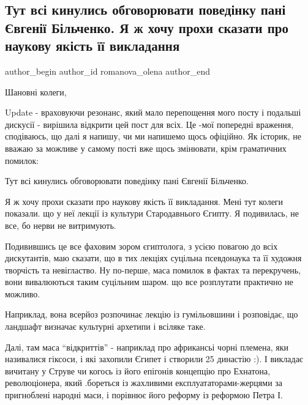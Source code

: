  
 
 
 
 
 
\subsection{Тут всі кинулись обговорювати поведінку пані Євгенії Більченко. Я ж хочу прохи сказати про наукову якість її викладання}
\label{sec:27_01_2021.fb.romanova_olena.1.bilchenko_egiptologia}
\ifcmt
 author_begin
   author_id romanova_olena
 author_end
\fi

Шановні колеги,

Update - враховуючи резонанс, який мало перепощення мого посту і подальші
дискусії - вирішила відкрити цей пост для всіх. Це -мої попередні враження,
сподіваюсь, що далі я напишу, чи ми напишемо щось офіційно. Як історик, не
вважаю за можливе у самому пості вже щось змінювати, крім граматичних помилок:

Тут всі кинулись обговорювати поведінку пані Євгенії Більченко.

Я ж хочу прохи сказати про наукову якість її викладання. Мені тут колеги
показали. що у неї лекції із культури Стародавнього Єгипту. Я подивилась, не
все, бо нерви не витримують.

Подивившись це все фаховим зором єгиптолога, з усією повагою до всіх
дискутантів, маю сказати, що в тих лекціях суцільна псевдонаука та її художня
творчість та невігластво. Ну по-перше, маса помилок в фактах та перекручень,
вони вивалюються таким суцільним шаром. що все розплутати практично не можливо.

Наприклад, вона всерйоз розпочинає лекцію із гумільовшини і розповідає, що
ландшафт визначає культурні архетипи і всіляке таке.

Далі, там маса \enquote{відкриттів} - наприклад про африкансьі чорні племена, яки
називалися гіксоси, і які захопили Єгипет і створили 25 династію :). І викладає
вичитану у Струве чи когось із його епігонів концепцію про Ехнатона,
революціонера, який .бореться із жахливими експлуататорами-жерцями за
пригноблені народні маси, і порівнює його реформу із реформою Петра І.

